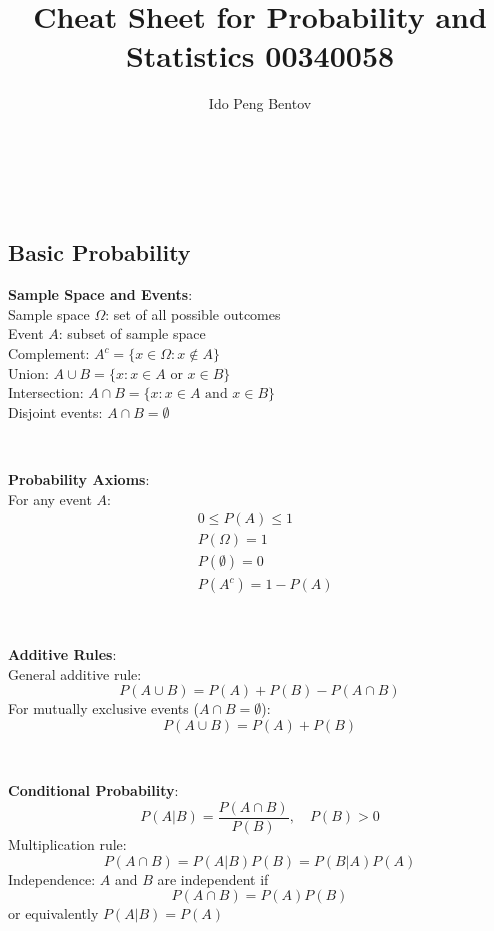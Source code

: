 \documentclass{article}
\title{Cheat Sheet for Probability and Statistics 00340058}
\author{Ido Peng Bentov}
\newenvironment{cheatformula}[1][Title]{
    \begin{minipage}{\linewidth}
    \textbf{#1}:\\
}{
    \end{minipage}\\[2ex]
}
\newcommand*{\NameAndID}{%
    \par\noindent\makebox[2.5in]{\hrulefill} \hspace{0.5in}\makebox[2.0in]{\hrulefill}%
    \par\noindent\makebox[2.5in][r]{Full Name}      \hspace{0.5in}\makebox[2.0in][r]{ID}%
}%
\begin{document}
\makeatletter
\begin{center}
    {\NameAndID}\\[2ex]
    {\huge{\textbf{\@title}}}\\[2ex]
\end{center}
\makeatother

\begin{multicols*}{2}
\raggedcolumns

\section{Basic Probability}

\begin{cheatformula}[Sample Space and Events]
    Sample space $\Omega$: set of all possible outcomes\\
    Event $A$: subset of sample space\\
    Complement: $A^c = \{x \in \Omega : x \notin A\}$\\
    Union: $A \cup B = \{x : x \in A \text{ or } x \in B\}$\\
    Intersection: $A \cap B = \{x : x \in A \text{ and } x \in B\}$\\
    Disjoint events: $A \cap B = \emptyset$
\end{cheatformula}

\begin{cheatformula}[Probability Axioms]
    For any event $A$:
    \begin{align*}
        &0 \leq P(A) \leq 1\\
        &P(\Omega) = 1\\
        &P(\emptyset) = 0\\
        &P(A^c) = 1 - P(A)
    \end{align*}
\end{cheatformula}

\begin{cheatformula}[Additive Rules]
    General additive rule:
    $$P(A \cup B) = P(A) + P(B) - P(A \cap B)$$
    For mutually exclusive events ($A \cap B = \emptyset$):
    $$P(A \cup B) = P(A) + P(B)$$
\end{cheatformula}

\begin{cheatformula}[Conditional Probability]
    $$P(A|B) = \frac{P(A \cap B)}{P(B)}, \quad P(B) > 0$$
    Multiplication rule:
    $$P(A \cap B) = P(A|B)P(B) = P(B|A)P(A)$$
    Independence: $A$ and $B$ are independent if
    $$P(A \cap B) = P(A)P(B)$$
    or equivalently $P(A|B) = P(A)$
\end{cheatformula}


\end{multicols*}
\end{document}
